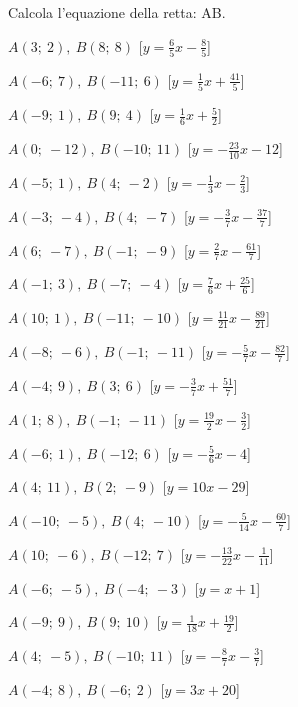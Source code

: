 \begin{esercizio}\label{ese:}
 Calcola l'equazione della retta: AB.
 \begin{enumeratea}
  \item  $A(3;~2),~B(8;~8)$ \hfill 
   [$y = \frac{6}{5} x -\frac{8}{5}$]
  \item  $A(-6;~7),~B(-11;~6)$ \hfill 
   [$y = \frac{1}{5} x +\frac{41}{5}$]
  \item  $A(-9;~1),~B(9;~4)$ \hfill 
   [$y = \frac{1}{6} x +\frac{5}{2}$]
  \item  $A(0;~-12),~B(-10;~11)$ \hfill 
   [$y = -\frac{23}{10} x -12$]
  \item  $A(-5;~1),~B(4;~-2)$ \hfill 
   [$y = -\frac{1}{3} x -\frac{2}{3}$]
  \item  $A(-3;~-4),~B(4;~-7)$ \hfill 
   [$y = -\frac{3}{7} x -\frac{37}{7}$]
  \item  $A(6;~-7),~B(-1;~-9)$ \hfill 
   [$y = \frac{2}{7} x -\frac{61}{7}$]
  \item  $A(-1;~3),~B(-7;~-4)$ \hfill 
   [$y = \frac{7}{6} x +\frac{25}{6}$]
  \item  $A(10;~1),~B(-11;~-10)$ \hfill 
   [$y = \frac{11}{21} x -\frac{89}{21}$]
  \item  $A(-8;~-6),~B(-1;~-11)$ \hfill 
   [$y = -\frac{5}{7} x -\frac{82}{7}$]
  \item  $A(-4;~9),~B(3;~6)$ \hfill 
   [$y = -\frac{3}{7} x +\frac{51}{7}$]
  \item  $A(1;~8),~B(-1;~-11)$ \hfill 
   [$y = \frac{19}{2} x -\frac{3}{2}$]
  \item  $A(-6;~1),~B(-12;~6)$ \hfill 
   [$y = -\frac{5}{6} x -4$]
  \item  $A(4;~11),~B(2;~-9)$ \hfill 
   [$y = 10 x -29$]
  \item  $A(-10;~-5),~B(4;~-10)$ \hfill 
   [$y = -\frac{5}{14} x -\frac{60}{7}$]
  \item  $A(10;~-6),~B(-12;~7)$ \hfill 
   [$y = -\frac{13}{22} x -\frac{1}{11}$]
  \item  $A(-6;~-5),~B(-4;~-3)$ \hfill 
   [$y = x +1$]
  \item  $A(-9;~9),~B(9;~10)$ \hfill 
   [$y = \frac{1}{18} x +\frac{19}{2}$]
  \item  $A(4;~-5),~B(-10;~11)$ \hfill 
   [$y = -\frac{8}{7} x -\frac{3}{7}$]
  \item  $A(-4;~8),~B(-6;~2)$ \hfill 
   [$y = 3 x +20$]
 \end{enumeratea}
\end{esercizio}

